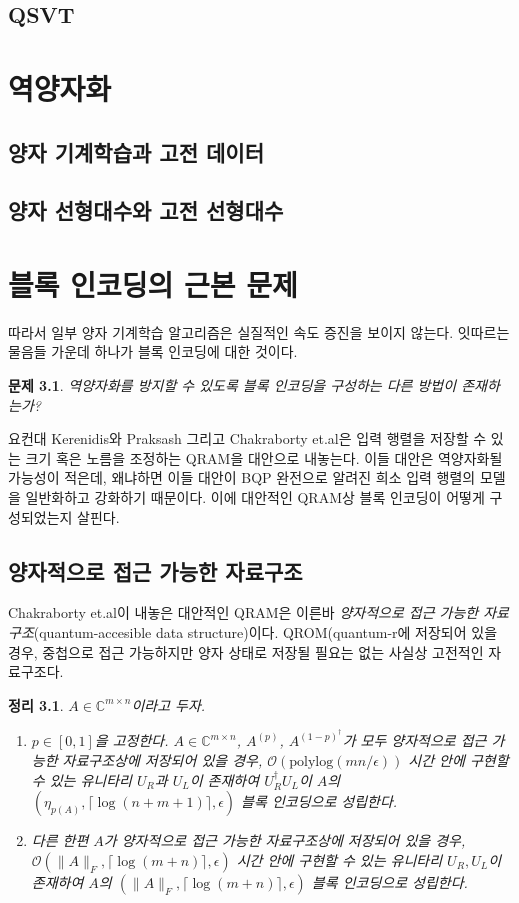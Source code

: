 \documentclass[hidelinks,article,a4paper,chapter,twocolumn]{oblivoir}
\newtheorem{theo}{정리}[chapter]
\newtheorem{prob}{문제}[chapter]
\let\oldbibliography
\renewcommand{}[1]{{%
\let\chapter\section
\oldbibliography{#1}}}
\begin{document}
\section{QSVT}
\chapter{역양자화}
\section{양자 기계학습과 고전 데이터}
\section{양자 선형대수와 고전 선형대수}
\chapter{블록 인코딩의 근본 문제}
따라서 일부 양자 기계학습 알고리즘은 실질적인 속도 증진을 보이지 않는다. 잇따르는
물음들 가운데 하나가 블록 인코딩에 대한 것이다.
\begin{prob}
  역양자화를 방지할 수 있도록 블록 인코딩을 구성하는 다른 방법이 존재하는가?
\end{prob}
요컨대 Kerenidis와 Praksash\cite{kerenidis2020} 그리고 Chakraborty 
et.al\cite{chakraborty2018}은 입력 행렬을 저장할 수 있는 크기 혹은 노름을 조정하는
QRAM을 대안으로 내놓는다. 이들 대안은 역양자화될 가능성이 적은데, 왜냐하면
이들 대안이 BQP 완전으로 알려진 \cite{HHL2009} 희소 입력 행렬의 모델을 일반화하고
강화하기 때문이다. 이에 대안적인 QRAM상 블록 인코딩이 어떻게 구성되었는지 살핀다.
\section{양자적으로 접근 가능한 자료구조}
Chakraborty et.al이 내놓은 대안적인 QRAM은 이른바 \emph{양자적으로 접근 가능한
자료구조}(quantum-accesible data structure)이다. QROM(quantum-r에 저장되어 있을 경우,
중첩으로 접근 가능하지만 양자 상태로 저장될 필요는 없는 사실상 고전적인
자료구조다. 
\begin{theo}
  $A\in\mathbb{C}^{m\times n}$이라고 두자. 
  \begin{enumerate}[label=(\roman*)]
    \item $p\in[0,1]$을 고정한다. $A\in\mathbb{C}^{m\times n}$, $A^(p)$, 
      $A^{(1-p)^{\dagger}}$가 모두 양자적으로 접근 가능한 자료구조상에 저장되어
      있을 경우, $\mathcal{O}(\textrm{polylog}(mn/\epsilon))$ 시간 안에
      구현할 수 있는 유니타리 $U_R$과 $U_L$이 존재하여 $U_R^{\dagger}U_L$이
      $A$의 $(\eta_{p(A)},\lceil\log(n+m+1)\rceil,\epsilon)$ 블록 인코딩으로
      성립한다.
    \item 다른 한편 $A$가 양자적으로 접근 가능한 자료구조상에 저장되어
      있을 경우, $\mathcal{O}(\|A\|_F,\lceil\log(m+n)\rceil, \epsilon)$
      시간 안에 구현할 수 있는 유니타리 $U_R,U_L$이 존재하여 $A$의
      $(\|A\|_F,\lceil\log(m+n)\rceil,\epsilon)$ 블록 인코딩으로 성립한다.
  \end{enumerate}
\end{theo}


\end{document}
